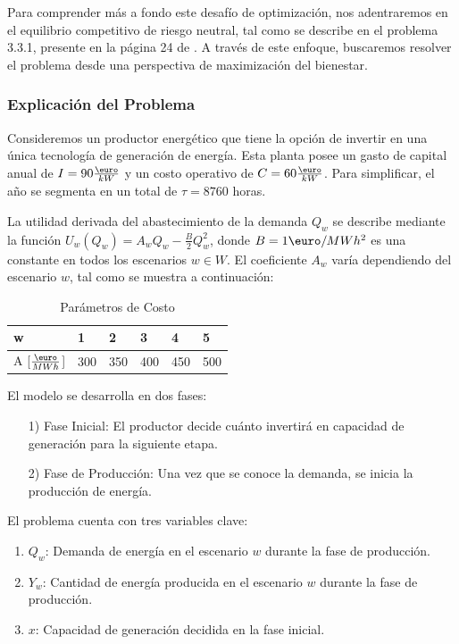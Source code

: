 \vspace{2.5mm}
Para comprender más a fondo este desafío de optimización, nos adentraremos en el equilibrio competitivo de riesgo neutral, tal como se describe en el problema 3.3.1, presente en la página 24 de . A través de este enfoque, buscaremos resolver el problema desde una perspectiva de maximización del bienestar.


\subsubsection{Explicación del Problema}

Consideremos un productor energético que tiene la opción de invertir en una única tecnología de generación de energía. Esta planta posee un gasto de capital anual de \(I=90 \frac{\textup{\euro}}{kW}\) y un costo operativo de \(C=60 \frac{\textup{\euro}}{kW}\). Para simplificar, el año se segmenta en un total de \(\tau = 8760\) horas.

\vspace{2.5mm}
La utilidad derivada del abastecimiento de la demanda \(Q_w\) se describe mediante la función \(U_w(Q_w) = A_wQ_w-\frac{B}{2}Q_w^2\), donde \(B = 1\textup{\euro}/MWh^2\) es una constante en todos los escenarios \(w \in W\). El coeficiente \(A_w\) varía dependiendo del escenario \(w\), tal como se muestra a continuación:

\begin{table}[H]
\centering
\begin{tabular}{|l|l|l|l|l|l|}
\hline
\textbf{w} & \textbf{1} & \textbf{2} & 3 & 4 & 5 \\ \hline
A {[$\frac{\textup{\euro}}{MWh}$]} & 300 & 350 & 400 & 450 & 500 \\ \hline
\end{tabular}
\caption{Parámetros de Costo}
\end{table}

\vspace{2.5mm}

El modelo se desarrolla en dos fases:
\begin{enumerate}
    \item[1)] Fase Inicial: El productor decide cuánto invertirá en capacidad de generación para la siguiente etapa.
    \item[2)] Fase de Producción: Una vez que se conoce la demanda, se inicia la producción de energía.
\end{enumerate}

El problema cuenta con tres variables clave:
\vspace{2.5mm}
\begin{enumerate}
    \item \(Q_w\): Demanda de energía en el escenario \(w\) durante la fase de producción.
    \item \(Y_w\): Cantidad de energía producida en el escenario \(w\) durante la fase de producción.
    \item \(x\): Capacidad de generación decidida en la fase inicial.
\end{enumerate}

